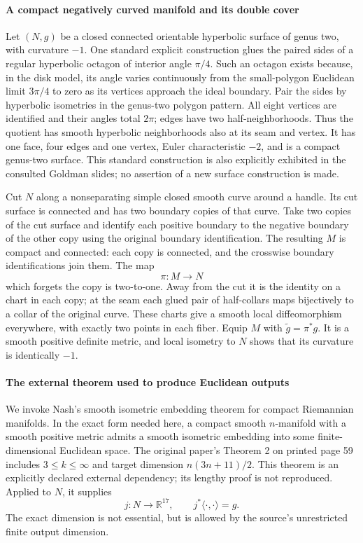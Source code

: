 \documentclass[11pt]{article}
\begin{document}
\paragraph{A compact negatively curved manifold and its double cover}
Let $(N,g)$ be a closed connected orientable hyperbolic surface of genus two, with curvature $-1$. One standard explicit construction glues the paired sides of a regular hyperbolic octagon of interior angle $\pi/4$. Such an octagon exists because, in the disk model, its angle varies continuously from the small-polygon Euclidean limit $3\pi/4$ to zero as its vertices approach the ideal boundary. Pair the sides by hyperbolic isometries in the genus-two polygon pattern. All eight vertices are identified and their angles total $2\pi$; edges have two half-neighborhoods. Thus the quotient has smooth hyperbolic neighborhoods also at its seam and vertex. It has one face, four edges and one vertex, Euler characteristic $-2$, and is a compact genus-two surface. This standard construction is also explicitly exhibited in the consulted Goldman slides; no assertion of a new surface construction is made.

Cut $N$ along a nonseparating simple closed smooth curve around a handle. Its cut surface is connected and has two boundary copies of that curve. Take two copies of the cut surface and identify each positive boundary to the negative boundary of the other copy using the original boundary identification. The resulting $M$ is compact and connected: each copy is connected, and the crosswise boundary identifications join them. The map
\[
 \pi:M\longrightarrow N
\]
which forgets the copy is two-to-one. Away from the cut it is the identity on a chart in each copy; at the seam each glued pair of half-collars maps bijectively to a collar of the original curve. These charts give a smooth local diffeomorphism everywhere, with exactly two points in each fiber. Equip $M$ with $\widetilde g=\pi^*g$. It is a smooth positive definite metric, and local isometry to $N$ shows that its curvature is identically $-1$.

\paragraph{The external theorem used to produce Euclidean outputs}
We invoke Nash's smooth isometric embedding theorem for compact Riemannian manifolds. In the exact form needed here, a compact smooth $n$-manifold with a smooth positive metric admits a smooth isometric embedding into some finite-dimensional Euclidean space. The original paper's Theorem 2 on printed page 59 includes $3\leq k\leq\infty$ and target dimension $n(3n+11)/2$. This theorem is an explicitly declared external dependency; its lengthy proof is not reproduced. Applied to $N$, it supplies
\[
 j:N\longrightarrow\mathbb R^{17},\qquad j^*\langle\cdot,\cdot\rangle=g.
\]
The exact dimension is not essential, but is allowed by the source's unrestricted finite output dimension.
\end{document}
